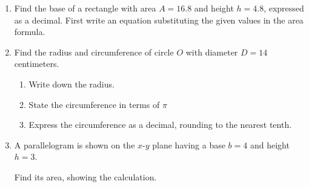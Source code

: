 \begin{enumerate}
\item Find the base of a rectangle with area $A=16.8$ and height $h=4.8$, expressed as a decimal. First write an equation substituting the given values in the area formula.
  \begin{flushright}
  \end{flushright}

\item Find the radius and circumference of circle $O$ with diameter $D=14$ centimeters.
  \begin{multicols}{2}
  \raggedcolumns
  \begin{enumerate}
    \item Write down the radius. \vspace{1.2cm}
    \item State the circumference in terms of $\pi$ \vspace{1cm}
    \item Express the circumference as a decimal, rounding to the nearest tenth.
  \end{enumerate}
  \columnbreak
  \end{multicols}

\newpage
\item A parallelogram is shown on the $x$-$y$ plane having a base $b=4$ and height $h=3$. 
  \begin{multicols}{2}
    Find its area, showing the calculation.
      \begin{flushright}
      \end{flushright}
  \end{multicols} 


\end{enumerate}
